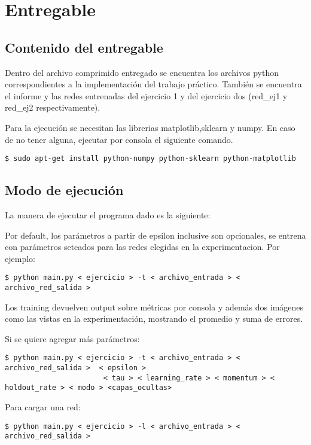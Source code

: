 \section{Entregable}
\subsection{Contenido del entregable}

Dentro del archivo comprimido entregado se encuentra los archivos python correspondientes a la implementación del trabajo práctico. También se encuentra el informe y las redes entrenadas del ejercicio 1 y del ejercicio dos (red\_ej1 y red\_ej2 respectivamente).

Para la ejecuci\'on se necesitan las librerias matplotlib,sklearn y numpy.
En caso de no tener alguna, ejecutar por consola el siguiente comando.

\begin{verbatim}
$ sudo apt-get install python-numpy python-sklearn python-matplotlib
\end{verbatim}

\subsection{Modo de ejecución}

La manera de ejecutar el programa dado es la siguiente:

Por default, los parámetros a partir de epsilon inclusive son opcionales, se entrena con parámetros seteados para las redes elegidas en la experimentacion. Por ejemplo:


\begin{verbatim}
$ python main.py < ejercicio > -t < archivo_entrada > < archivo_red_salida >  
\end{verbatim}

Los training devuelven output sobre métricas por consola y además dos imágenes como las vistas en la experimentación, mostrando el promedio y suma de errores.

Si se quiere agregar más parámetros:

\begin{verbatim}
$ python main.py < ejercicio > -t < archivo_entrada > < archivo_red_salida >  < epsilon > 
                       < tau > < learning_rate > < momentum > < holdout_rate > < modo > <capas_ocultas> 
\end{verbatim}

Para cargar una red:

\begin{verbatim}
$ python main.py < ejercicio > -l < archivo_entrada > < archivo_red_salida > 
\end{verbatim}

